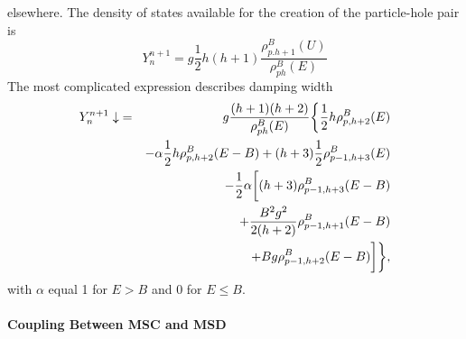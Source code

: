 elsewhere. The density of states available for the creation of the
particle-hole pair is
\begin{equation}
Y_{n}^{n+1}=g\frac{1}{2}h(h+1)\frac{\rho_{p.h+1}^{B}(U)}{\rho_{ph}^{B}(E)}
\label{Yplus}
\end{equation}
The most complicated expression describes damping width
\begin{eqnarray}
Y_{n}^{n+1}\downarrow & = & g\frac{(h+1)(h+2)}{\rho_{ph}^{B}(E)}\biggl\{%
\frac{1}{2}h\rho_{p,h+2}^{B}(E)  \notag \\
&&-\alpha\frac{1}{2}h\rho_{p,h+2}^{B}(E-B)+(h+3)\frac{1}{2}%
\rho_{p-1,h+3}^{B}(E)  \notag \\
& & -\frac{1}{2}\alpha\biggl[(h+3)\rho_{p-1,h+3}^{B}(E-B)  \notag
\label{Ydown} \\
& & +\frac{B^{2}g^{2}}{2(h+2)}\rho_{p-1,h+1}^{B}(E-B)  \notag \\
&& +Bg\rho_{p-1,h+2}^{B}(E-B)\biggr]\biggr\},
\end{eqnarray}
\noindent with $\alpha$ equal 1 for $E>B$ and 0 for $E\leq B$.

\medskip

\paragraph{Coupling Between MSC%
 and MSD%
}

